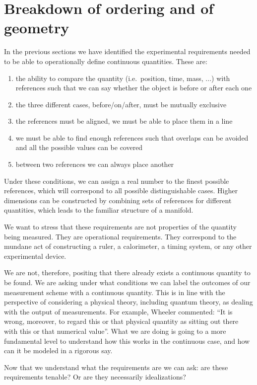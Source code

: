 \documentclass[12pt]{iopart}
\begin{document}
\section{Breakdown of ordering and of geometry}

In the previous sections we have identified the experimental requirements needed to be able to operationally define continuous quantities. These are:
\begin{enumerate}
	\item the ability to compare the quantity (i.e.~position, time, mass, ...) with references such that we can say whether the object is before or after each one
	\item the three different cases, before/on/after, must be mutually exclusive
	\item the references must be aligned, we must be able to place them in a line
	\item we must be able to find enough references such that overlaps can be avoided and all the possible values can be covered
	\item between two references we can always place another
\end{enumerate}
Under these conditions, we can assign a real number to the finest possible references, which will correspond to all possible distinguishable cases. Higher dimensions can be constructed by combining sets of references for different quantities, which leads to the familiar structure of a manifold.

We want to stress that these requirements are not properties of the quantity being measured. They are operational requirements. They correspond to the mundane act of constructing a ruler, a calorimeter, a timing system, or any other experimental device.

We are not, therefore, positing that there already exists a continuous quantity to be found. We are asking under what conditions we can label the outcomes of our measurement scheme with a continuous quantity. This is in line with the perspective of considering a physical theory, including quantum theory, as dealing with the output of measurements. For example, Wheeler commented\cite{Wheeler}: ``It is wrong, moreover, to regard this or that physical quantity as sitting out there with this or that numerical value''. What we are doing is going to a more fundamental level to understand how this works in the continuous case, and how can it be modeled in a rigorous say.

Now that we understand what the requirements are we can ask: are these requirements tenable? Or are they necessarily idealizations?
\end{document}
